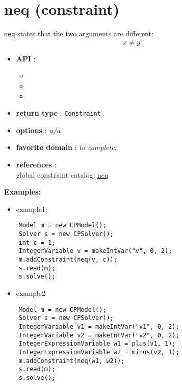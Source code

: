 \label{neq}
\hypertarget{neq}{}

\section{neq (constraint)}\label{neq:neqconstraint}\hypertarget{neq:neqconstraint}{}

\begin{notedef}
  \texttt{neq} states that the two arguments are different:
$$x \neq y.$$
\end{notedef}
\begin{itemize}
	\item \textbf{API} :
	\begin{itemize}
		\item {}
		\item {}
		\item {}
	\end{itemize}
	\item \textbf{return type} : \texttt{Constraint}
	\item \textbf{options} : \emph{n/a}
	\item \textbf{favorite domain} : \emph{to complete}.
	\item \textbf{references} :\\
      global constraint catalog: \href{http://www.emn.fr/x-info/sdemasse/gccat/Cneq.html}{neq}
\end{itemize}

\textbf{Examples:}
\begin{itemize}
	\item example1:
\end{itemize}

\begin{lstlisting}
	Model m = new CPModel();
	Solver s = new CPSolver();
	int c = 1;
	IntegerVariable v = makeIntVar("v", 0, 2);
	m.addConstraint(neq(v, c));
	s.read(m);
	s.solve();
\end{lstlisting}
\begin{itemize}
	\item example2
\end{itemize}

\begin{lstlisting}
	Model m = new CPModel();
	Solver s = new CPSolver();
	IntegerVariable v1 = makeIntVar("v1", 0, 2);
	IntegerVariable v2 = makeIntVar("v2", 0, 2);
	IntegerExpressionVariable w1 = plus(v1, 1);
	IntegerExpressionVariable w2 = minus(v2, 1);
	m.addConstraint(neq(w1, w2));
	s.read(m);
	s.solve();
\end{lstlisting}
